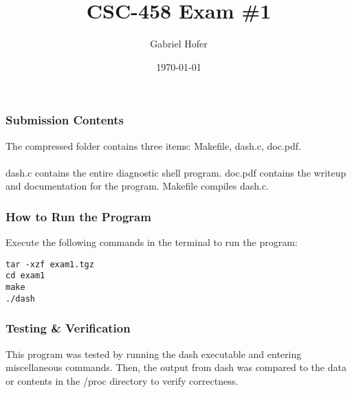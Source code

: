 \documentclass[12pt]{article}
\begin{document}
\title{CSC-458 Exam \#1}
\author{Gabriel Hofer}
\date{\today}
\maketitle
\noindent \subsubsection*{Submission Contents} 
\noindent The compressed folder contains three items: {\ttfamily Makefile}, {\ttfamily dash.c}, {\ttfamily doc.pdf}. \\ \\ {\ttfamily dash.c} contains the entire diagnostic shell program. {\ttfamily doc.pdf} contains the writeup and documentation for the program. {\ttfamily Makefile} compiles {\ttfamily dash.c}. 

\noindent \subsubsection*{How to Run the Program} \par
Execute the following commands in the terminal to run the program: 
\begin{verbatim}
tar -xzf exam1.tgz
cd exam1
make 
./dash
\end{verbatim}

\noindent \subsubsection*{Testing \& Verification} \par
This program was tested by running the {\ttfamily dash} executable and entering miscellaneous commands. Then, the output from {\ttfamily dash} was compared to the data or contents in the {\ttfamily /proc} directory to verify correctness.
\end{document}
